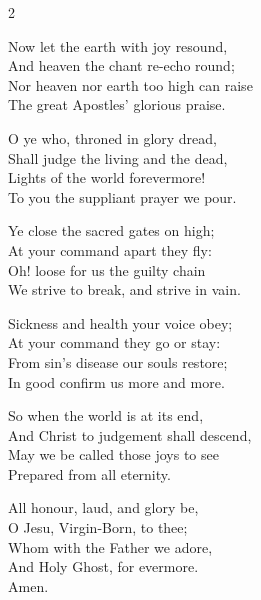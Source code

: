 \begin{multicols}{2}
\raggedcolumns
\begin{enpars}
Now let the earth with joy resound,\\
And heaven the chant re-echo round;\\
Nor heaven nor earth too high can raise\\
The great Apostles' glorious praise.

O ye who, throned in glory dread,\\
Shall judge the living and the dead,\\
Lights of the world forevermore!\\
To you the suppliant prayer we pour.

Ye close the sacred gates on high;\\
At your command apart they fly:\\
Oh! loose for us the guilty chain\\
We strive to break, and strive in vain.

Sickness and health your voice obey;\\
At your command they go or stay:\\
From sin's disease our souls restore;\\
In good confirm us more and more.

So when the world is at its end,\\
And Christ to judgement shall descend,\\
May we be called those joys to see\\
Prepared from all eternity.

All honour, laud, and glory be,\\
O Jesu, Virgin-Born, to thee;\\
Whom with the Father we adore,\\
And Holy Ghost, for evermore.\\
Amen.\end{enpars}\end{multicols}